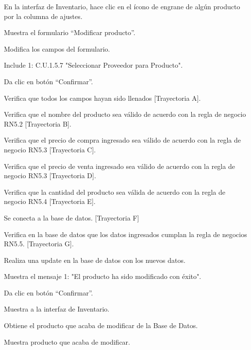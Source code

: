 \begin{UCtrayectoria}
	
	\UCpaso[\UCactor] En la interfaz de Inventario, hace clic en el ícono de engrane de algún producto por la columna de ajustes.
	
	\UCpaso[\UCsist] Muestra el formulario “Modificar producto”.

	\UCpaso[\UCsist] 
	
	\UCpaso[\UCactor] Modifica los campos del formulario.

	\UCpaso[] Include 1:  C.U.1.5.7 "Seleccionar Proveedor para Producto".
	
	\UCpaso[\UCactor] Da clic en botón “Confirmar”.

	\UCpaso[\UCsist] Verifica que todos los campos hayan sido llenados [Trayectoria A].

	\UCpaso[\UCsist] Verifica que el nombre del producto sea válido de acuerdo con la regla de negocio RN5.2 [Trayectoria B].

	\UCpaso[\UCsist] Verifica que el precio de compra ingresado sea válido de acuerdo con la regla de negocio RN5.3 [Trayectoria C].

	\UCpaso[\UCsist] Verifica que el precio de venta ingresado sea válido de acuerdo con la regla de negocio RN5.3 [Trayectoria D].
	
	\UCpaso[\UCsist] Verifica que la cantidad del producto sea válida de acuerdo con la regla de negocio RN5.4 [Trayectoria E].

	\UCpaso[\UCsist] Se conecta a la base de datos. [Trayectoria F]

	\UCpaso[\UCsist] Verifica en la base de datos que los datos ingresados cumplan la regla de negocios RN5.5. [Trayectoria G].

	\UCpaso[\UCsist] Realiza una update en la base de datos con los nuevos datos.

	\UCpaso[\UCsist] Muestra el mensaje 1: "El producto ha sido modificado con éxito".

	\UCpaso[\UCactor] Da clic en botón “Confirmar”.

	\UCpaso[\UCsist] Muestra a la interfaz de Inventario.

	\UCpaso[\UCsist] Obtiene el producto que acaba de modificar de la Base de Datos.

	\UCpaso[\UCsist] Muestra producto que acaba de modificar.
	
\end{UCtrayectoria}

